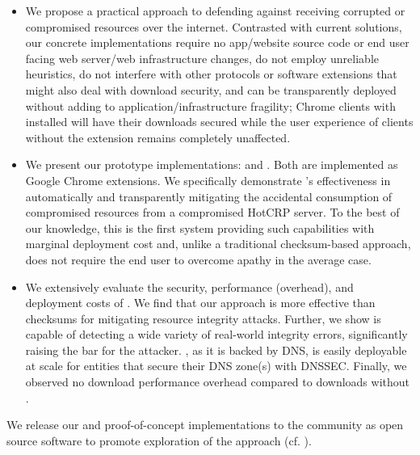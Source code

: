 \begin{itemize}

  \item We propose a practical approach to defending against receiving corrupted
  or compromised resources over the internet. Contrasted with current solutions,
  our concrete implementations require no app/website source code or end user
  facing web server/web infrastructure changes, do not employ unreliable
  heuristics, do not interfere with other protocols or software extensions that
  might also deal with download security, and can be transparently deployed
  without adding to application/infrastructure fragility; \eg Chrome clients
  with \DNSSYS{} installed will have their downloads secured while the user
  experience of clients without the extension remains completely unaffected.

  \item We present our prototype \SYSTEM{} implementations: \DNSSYS{} and
  \DHTSYS{}. Both are implemented as Google Chrome extensions. We specifically
  demonstrate \DNSSYS{}'s effectiveness in automatically and transparently
  mitigating the accidental consumption of compromised resources from a
  compromised HotCRP server. To the best of our knowledge, this is the
  first system providing such capabilities with marginal deployment cost
  and, unlike a traditional checksum-based approach, does not require the end
  user to overcome apathy in the average case.

  \item We extensively evaluate the security, performance (overhead), and
  deployment costs of \DNSSYS{}. We find that our approach is more effective
  than checksums for mitigating resource integrity attacks. Further, we show
  \DNSSYS{} is capable of detecting a wide variety of real-world integrity
  errors, significantly raising the bar for the attacker. \DNSSYS{}, as it is
  backed by DNS, is easily deployable at scale for entities that secure their
  DNS zone(s) with DNSSEC. Finally, we observed no download performance overhead
  compared to downloads without \DNSSYS{}.

\end{itemize}

We release our \DNSSYS{} and \DHTSYS{} proof-of-concept implementations to the
community as open source software to promote exploration of the \SYSTEM{}
approach (cf. ).
